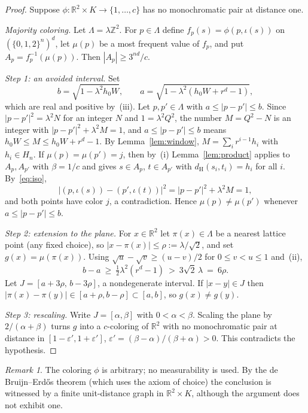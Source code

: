 \documentclass[11pt]{amsart}
\theoremstyle{definition}
\theoremstyle{remark}
\newtheorem{remark}[theorem]{Remark}
\newcommand{\R}{\mathbb{R}}
\newcommand{\Z}{\mathbb{Z}}
\newcommand{\dH}{d_{\mathrm H}}
\begin{document}
\begin{proof}
Suppose $\phi:\R^2\times K\to\{1,\dots,c\}$ has no monochromatic pair at distance one.

\emph{Majority coloring.} Let $\Lambda=\lambda\Z^2$. For $p\in\Lambda$ define
$f_p(s)=\phi(p,\iota(s))$ on $(\{0,1,2\}^n)^d$, let $\mu(p)$ be a most frequent value of
$f_p$, and put $A_p=f_p^{-1}(\mu(p))$. Then $|A_p|\ge 3^{nd}/c$.

\emph{Step 1: an avoided interval.} Set
\[
  b=\sqrt{1-\lambda^2h_0W},\qquad a=\sqrt{1-\lambda^2(h_0W+r^d-1)},
\]
which are real and positive by~(iii). Let $p,p'\in\Lambda$ with $a\le|p-p'|\le b$. Since
$|p-p'|^2=\lambda^2N$ for an integer $N$ and $1=\lambda^2Q^2$, the number $M=Q^2-N$ is an
integer with $|p-p'|^2+\lambda^2M=1$, and $a\le|p-p'|\le b$ means
$h_0W\le M\le h_0W+r^d-1$. By Lemma~\ref{lem:window}, $M=\sum_i r^{i-1}h_i$ with
$h_i\in H_n$. If $\mu(p)=\mu(p')=j$, then by~(i) Lemma~\ref{lem:product} applies to
$A_p,A_{p'}$ with $\beta=1/c$ and gives $s\in A_p$, $t\in A_{p'}$ with
$\dH(s_i,t_i)=h_i$ for all $i$. By~\eqref{eq:iso},
\[
  \bigl|(p,\iota(s))-(p',\iota(t))\bigr|^2=|p-p'|^2+\lambda^2M=1,
\]
and both points have color $j$, a contradiction. Hence $\mu(p)\ne\mu(p')$ whenever
$a\le|p-p'|\le b$.

\emph{Step 2: extension to the plane.} For $x\in\R^2$ let $\pi(x)\in\Lambda$ be a nearest
lattice point (any fixed choice), so $|x-\pi(x)|\le\rho:=\lambda/\sqrt2$, and set
$g(x)=\mu(\pi(x))$. Using $\sqrt u-\sqrt v\ge(u-v)/2$ for $0\le v<u\le1$ and~(ii),
\[
  b-a\ \ge\ \tfrac12\lambda^2(r^d-1)\ >\ 3\sqrt2\,\lambda\ =\ 6\rho .
\]
Let $J=[a+3\rho,\,b-3\rho]$, a nondegenerate interval. If $|x-y|\in J$ then
$|\pi(x)-\pi(y)|\in[a+\rho,b-\rho]\subset[a,b]$, so $g(x)\ne g(y)$.

\emph{Step 3: rescaling.} Write $J=[\alpha,\beta]$ with $0<\alpha<\beta$. Scaling the plane by
$2/(\alpha+\beta)$ turns $g$ into a $c$-coloring of $\R^2$ with no monochromatic pair at
distance in $[1-\varepsilon',1+\varepsilon']$, $\varepsilon'=(\beta-\alpha)/(\beta+\alpha)>0$.
This contradicts the hypothesis.
\end{proof}

\begin{remark}
The coloring $\phi$ is arbitrary; no measurability is used. By the de Bruijn--Erd\H{o}s theorem
(which uses the axiom of choice) the conclusion is witnessed by a finite unit-distance graph in
$\R^2\times K$, although the argument does not exhibit one.
\end{remark}
\end{document}
